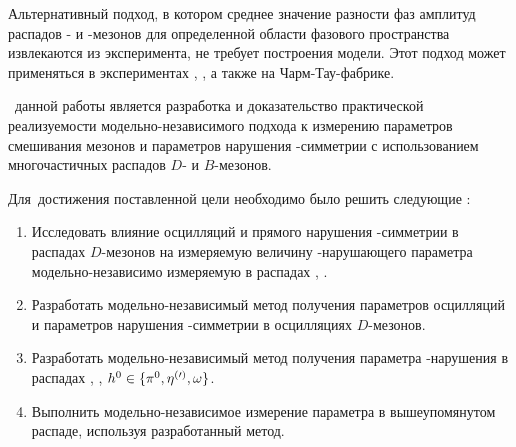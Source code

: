 Альтернативный подход, в котором среднее значение разности фаз амплитуд распадов \dn- и \dnbar-мезонов для определенной области фазового пространства извлекаются из эксперимента, не требует построения модели.  Этот подход может применяться в экспериментах \lhcb, \belleii, а также на Чарм-Тау-фабрике.

\aim\ данной работы является разработка и доказательство практической реализуемости модельно-независимого подхода к измерению параметров смешивания мезонов и параметров нарушения \cpconj-симметрии с использованием многочастичных распадов $D$- и $B$-мезонов.

Для~достижения поставленной цели необходимо было решить следующие {\tasks}:
\begin{enumerate}
  \item Исследовать влияние осцилляций и прямого нарушения \cpconj-симметрии в распадах $D$-мезонов на измеряемую величину \cpconj-нарушающего параметра \gphi модельно-независимо измеряемую в распадах \bdk, \dkpp.
  \item Разработать модельно-независимый метод получения параметров осцилляций и параметров нарушения \cpconj-симметрии в осцилляциях $D$-мезонов.
  \item Разработать модельно-независимый метод получения параметра \cpconj-нарушения \pphi в распадах \bdh, \dbkpp, $h^0\in\{\pi^0,\eta^{(\prime)},\omega\}$.
  \item Выполнить модельно-независимое измерение параметра \pphi в вышеупомянутом распаде, используя разработанный метод.
\end{enumerate}

